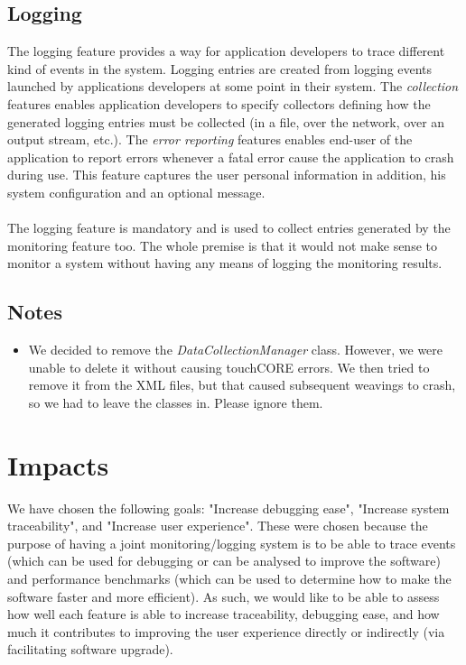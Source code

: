 \documentclass[paper=letter, fontsize=12pt]{scrartcl} %
\numberwithin{equation}{section} %
\numberwithin{figure}{section} %
\numberwithin{table}{section} %
\begin{document}
\subsection{Logging}
\hspace*{.5cm} The logging feature provides a way for application developers to trace different kind of events in the system. Logging entries are created from logging events launched by applications developers at some point in their system. The \textit{collection} features enables application developers to specify collectors defining how the generated logging entries must be collected (in a file, over the network, over an output stream, etc.). The \textit{error reporting} features enables end-user of the application to report errors whenever a fatal error cause the application to crash during use. This feature captures the user personal information in addition, his system configuration and an optional message. 
\\ \\
The logging feature is mandatory and is used to collect entries generated by the monitoring feature too. The whole premise is that it would not make sense to monitor a system without having any means of logging the monitoring results.

\subsection{Notes}
\begin{itemize}
\item We decided to remove the \textit{DataCollectionManager} class. However, we were unable to delete it without causing touchCORE errors. We then tried to remove it from the XML files, but that caused subsequent weavings to crash, so we had to leave the classes in. Please ignore them.
\end{itemize}

\newpage
\section{Impacts}
\hspace*{.5cm} We have chosen the following goals: "Increase debugging ease", "Increase system traceability", and "Increase user experience". These were chosen because the purpose of having a joint monitoring/logging system is to be able to trace events (which can be used for debugging or can be analysed to improve the software) and performance benchmarks (which can be used to determine how to make the software faster and more efficient). As such, we would like to be able to assess how well each feature is able to increase traceability, debugging ease, and how much it contributes to improving the user experience directly or indirectly (via facilitating software upgrade).
\end{document}
